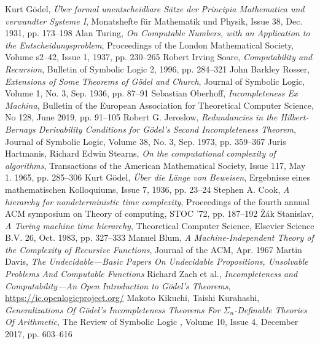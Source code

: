 \documentclass{article}
\theoremstyle{customstyle}
\begin{document}
\begin{thebibliography}{6}
  Kurt Gödel, \textit{Über formal unentscheidbare Sätze der Principia Mathematica und verwandter Systeme I}, Monatshefte für Mathematik und Physik, Issue 38, Dec. 1931, pp. 173--198
  Alan Turing, \textit{On Computable Numbers, with an Application to the Entscheidungsproblem}, Proceedings of the London Mathematical Society, Volume s2--42, Issue 1, 1937, pp. 230--265
  Robert Irving Soare, \textit{Computability and Recursion}, Bulletin of Symbolic Logic 2, 1996, pp. 284--321
  John Barkley Rosser, \textit{Extensions of Some Theorems of Gödel and Church}, Journal of Symbolic Logic, Volume 1, No. 3, Sep. 1936, pp. 87--91
  Sebastian Oberhoff, \textit{Incompleteness Ex Machina}, Bulletin of the European Association for Theoretical Computer Science, No 128, June 2019, pp. 91--105
  Robert G. Jeroslow, \textit{Redundancies in the Hilbert-Bernays Derivability Conditions for Gödel's Second Incompleteness Theorem}, Journal of Symbolic Logic, Volume 38, No. 3, Sep. 1973, pp. 359--367
  Juris Hartmanis, Richard Edwin Stearns, \textit{On the computational complexity of algorithms}, Transactions of the American Mathematical Society, Issue 117, May 1. 1965, pp. 285--306
  Kurt Gödel, \textit{Über die Länge von Beweisen}, Ergebnisse eines mathematischen Kolloquiums, Issue 7, 1936, pp. 23--24
  Stephen A. Cook, \textit{A hierarchy for nondeterministic time complexity}, Proceedings of the fourth annual ACM symposium on Theory of computing, STOC '72, pp. 187--192
  \v{Z}ák Stanislav, \textit{A Turing machine time hierarchy}, Theoretical Computer Science, Elsevier Science B.V. 26, Oct. 1983, pp. 327--333
  Manuel Blum, \textit{A Machine-Independent Theory of the Complexity of Recursive Functions}, Journal of the ACM, Apr. 1967
  Martin Davis, \textit{The Undecidable---Basic Papers On Undecidable Propositions, Unsolvable Problems And Computable Functions}
  Richard Zach et al., \textit{Incompleteness and Computability---An Open Introduction to Gödel's Theorems}, \url{https://ic.openlogicproject.org/}
  Makoto Kikuchi, Taishi Kurahashi, \textit{Generalizations Of Gödel's Incompleteness Theorems For $\Sigma_n$-Definable Theories Of Arithmetic}, The Review of Symbolic Logic , Volume 10, Issue 4, December 2017, pp. 603--616
\end{thebibliography}

\vfill\eject
\end{document}
